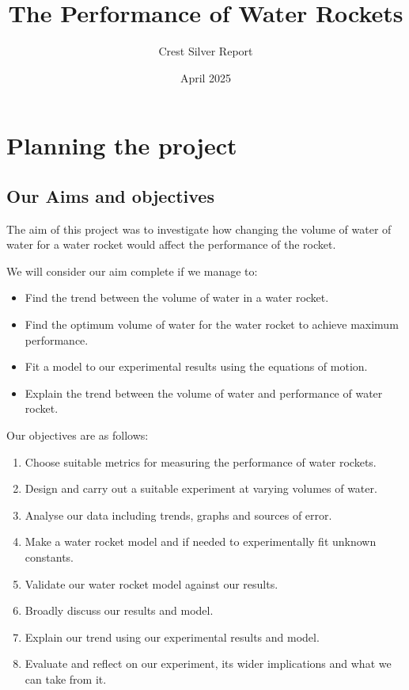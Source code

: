 \documentclass[14pt]{article}
\title{The Performance of Water Rockets}
\author{Crest Silver Report}
\date{April 2025}
\begin{document}

\maketitle
\tableofcontents
\section{Planning the project}
\subsection{Our Aims and objectives}

The aim of this project was to investigate how changing the volume of water of water for a water rocket would affect the performance of the rocket.

We will consider our aim complete if we manage to:
\begin{itemize}
    \item Find the trend between the volume of water in a water rocket.
\end{itemize}
\begin{itemize}
    \item Find the optimum volume of water for the water rocket to achieve maximum performance.
    \item Fit a model to our experimental results using the equations of motion.
    \item Explain the trend between the volume of water and performance of water rocket.
\end{itemize}
Our objectives are as follows:
\begin{enumerate}
    \item Choose suitable metrics for measuring the performance of water rockets.
    \item Design and carry out a suitable experiment at varying volumes of water.
    \item Analyse our data including trends, graphs and sources of error.
    \item Make a water rocket model and if needed to experimentally fit unknown constants.
    \item Validate our water rocket model against our results.
    \item Broadly discuss our results and model.
    \item Explain our trend using our experimental results and model.
    \item Evaluate and reflect on our experiment, its wider implications and what we can take from it.
\end{enumerate}
\end{document}
